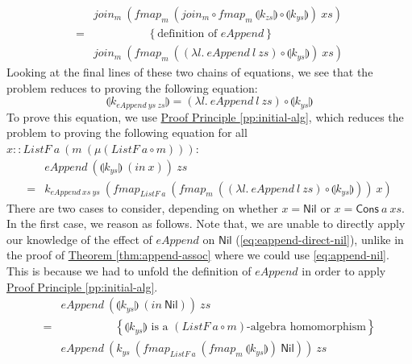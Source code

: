 \documentclass{jfp1}
\newcommand{\fold}[1]{\llparenthesis #1 \rrparenthesis}
\newcommand{\eqAnnotation}[1]{\hspace{2cm}\left\{\textrm{#1}\right\}}
\newcommand{\proofprinref}[1]{\hyperref[#1]{Proof Principle \ref*{#1}}}
\newcommand{\thmref}[1]{\hyperref[#1]{Theorem \ref*{#1}}}
\begin{document}
\begin{proof*}
\begin{displaymath}
\begin{array}{cl}
      &\mathit{join_m}~(\mathit{fmap_m}~(\mathit{join_m} \circ \mathit{fmap}_m~\fold{k_{zs}} \circ \fold{k_{ys}})~\mathit{xs}) \\
      =&\eqAnnotation{definition of $\mathit{eAppend}$} \\
      &\mathit{join_m}~(\mathit{fmap_m}~((\lambda l.~\mathit{eAppend}~l~\mathit{zs}) \circ \fold{k_{ys}})~\mathit{xs})
    \end{array}
  \end{displaymath}
  Looking at the final lines of these two chains of equations, we see
  that the problem reduces to proving the following equation:
  \begin{equation}
    \label{eq:fold-fusion-target}
    \fold{k_{\mathit{eAppend}~\mathit{ys}~\mathit{zs}}} = (\lambda l.~\mathit{eAppend}~l~\mathit{zs}) \circ \fold{k_{ys}}
  \end{equation}
  To prove this equation, we use \proofprinref{pp:initial-alg}, which
  reduces the problem to proving the following equation for all $x ::
  \mathit{ListF}~a~(m~(\mu(\mathit{ListF}~a \circ m)))$:
  \begin{displaymath}
    \begin{array}{cl}
      &\mathit{eAppend}~(\fold{k_{ys}}~(\mathit{in}~x))~\mathit{zs} \\
      =& k_{\mathit{eAppend}~\mathit{xs}~\mathit{ys}}~(\mathit{fmap}_{\mathit{ListF}~a}~(\mathit{fmap}_m~((\lambda l.~\mathit{eAppend}~l~\mathit{zs}) \circ \fold{k_{ys}}))~x)
    \end{array}
  \end{displaymath}
  There are two cases to consider, depending on whether $x =
  \mathsf{Nil}$ or $x = \mathsf{Cons}~a~\mathit{xs}$. In the first
  case, we reason as follows. Note that, we are unable to directly
  apply our knowledge of the effect of $\mathit{eAppend}$ on
  $\mathsf{Nil}$ (\autoref{eq:eappend-direct-nil}), unlike in the
  proof of \thmref{thm:append-assoc} where we could use
  \autoref{eq:append-nil}. This is because we had to unfold the
  definition of $\mathit{eAppend}$ in order to apply
  \proofprinref{pp:initial-alg}.
  \begin{displaymath}
    \begin{array}{cl}
      &\mathit{eAppend}~(\fold{k_{ys}}~(\mathit{in}~\mathsf{Nil}))~\mathit{zs} \\
      =&\eqAnnotation{$\fold{k_{ys}}$ is a $(\mathit{ListF}~a \circ m)$-algebra homomorphism} \\
      &\mathit{eAppend}~(k_{ys}~(\mathit{fmap}_{\mathit{ListF}~a}~(\mathit{fmap}_m~\fold{k_{ys}})~\mathsf{Nil}))~\mathit{zs} \\

\end{array}
\end{displaymath}
\end{proof*}
\end{document}
